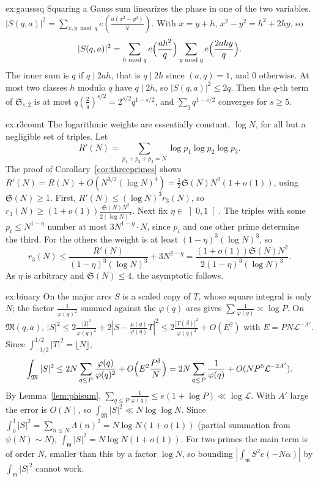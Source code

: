 \begin{solution}{ex:gausssq}
\idea Squaring a Gauss sum linearizes the phase in one of the two variables.
\writeup $|S(q,a)|^2=\sum_{x,y\bmod q}e(\frac{a(x^2-y^2)}q)$. With $x=y+h$, $x^2-y^2=h^2+2hy$, so
\[
|S(q,a)|^2=\sum_{h\bmod q}e\Bigl(\frac{ah^2}q\Bigr)\sum_{y\bmod q}e\Bigl(\frac{2ahy}q\Bigr).
\]
The inner sum is $q$ if $q\mid2ah$, that is $q\mid2h$ since $(a,q)=1$, and $0$ otherwise. At most two classes $h$ modulo $q$ have $q\mid2h$, so $|S(q,a)|^2\le2q$. Then the $q$-th term of $\mathfrak S_{s,2}$ is at most $q(\frac{2}{q})^{s/2}=2^{s/2}q^{1-s/2}$, and $\sum_qq^{1-s/2}$ converges for $s\ge5$.
\end{solution}

\begin{solution}{ex:r3count}
\idea The logarithmic weights are essentially constant, $\log N$, for all but a negligible set of triples.
\writeup Let
\[
R'(N)=\sum_{p_1+p_2+p_3=N}\log p_1\log p_2\log p_3.
\]
The proof of Corollary~\ref{cor:threeprimes} shows $R'(N)=R(N)+O(N^{3/2}(\log N)^4)=\frac12\mathfrak S(N)N^2(1+o(1))$, using $\mathfrak S(N)\ge1$. First, $R'(N)\le(\log N)^3r_3(N)$, so $r_3(N)\ge(1+o(1))\frac{\mathfrak S(N)N^2}{2(\log N)^3}$. Next fix $\eta\in\left]0,1\right[$. The triples with some $p_i\le N^{1-\eta}$ number at most $3N^{1-\eta}\cdot N$, since $p_i$ and one other prime determine the third. For the others the weight is at least $(1-\eta)^3(\log N)^3$, so
\[
r_3(N)\le\frac{R'(N)}{(1-\eta)^3(\log N)^3}+3N^{2-\eta}=\frac{(1+o(1))\mathfrak S(N)N^2}{2(1-\eta)^3(\log N)^3}.
\]
As $\eta$ is arbitrary and $\mathfrak S(N)\le4$, the asymptotic follows.
\end{solution}

\begin{solution}{ex:binary}
\idea On the major arcs $S$ is a scaled copy of $T$, whose square integral is only $N$; the factor $\frac1{\varphi(q)^2}$ summed against the $\varphi(q)$ arcs gives $\sum\frac1{\varphi(q)}\asymp\log P$.
\writeup On $\mathfrak M(q,a)$, $|S|^2\le2\frac{|T|^2}{\varphi(q)^2}+2|S-\frac{\mu(q)}{\varphi(q)}T|^2\le2\frac{|T(\beta)|^2}{\varphi(q)^2}+O(E^2)$ with $E=PN\mathcal L^{-A'}$. Since $\int_{-1/2}^{1/2}|T|^2=\lfloor N\rfloor$,
\[
\int_{\mathfrak M}|S|^2\le2N\sum_{q\le P}\frac{\varphi(q)}{\varphi(q)^2}+O\Bigl(E^2\frac{P^3}N\Bigr)=2N\sum_{q\le P}\frac1{\varphi(q)}+O(NP^5\mathcal L^{-2A'}).
\]
By Lemma~\ref{lem:phisum}, $\sum_{q\le P}\frac1{\varphi(q)}\le e(1+\log P)\ll\log\mathcal L$. With $A'$ large the error is $O(N)$, so $\int_{\mathfrak M}|S|^2\ll N\log\log N$. Since $\int_0^1|S|^2=\sum_{n\le N}\Lambda(n)^2=N\log N(1+o(1))$ (partial summation from $\psi(N)\sim N$), $\int_{\mathfrak m}|S|^2=N\log N(1+o(1))$. For two primes the main term is of order $N$, smaller than this by a factor $\log N$, so bounding $|\int_{\mathfrak m}S^2e(-N\alpha)|$ by $\int_{\mathfrak m}|S|^2$ cannot work.
\end{solution}

